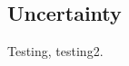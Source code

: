 \documentclass[../thesis.tex]{subfiles}
\begin{document}
\begin{refsection}
\chapter{Uncertainty}
Testing, testing2\cite{Stant_2017}.
\onlyinsubfile{}
\printbibliography
\end{refsection}
\end{document}
